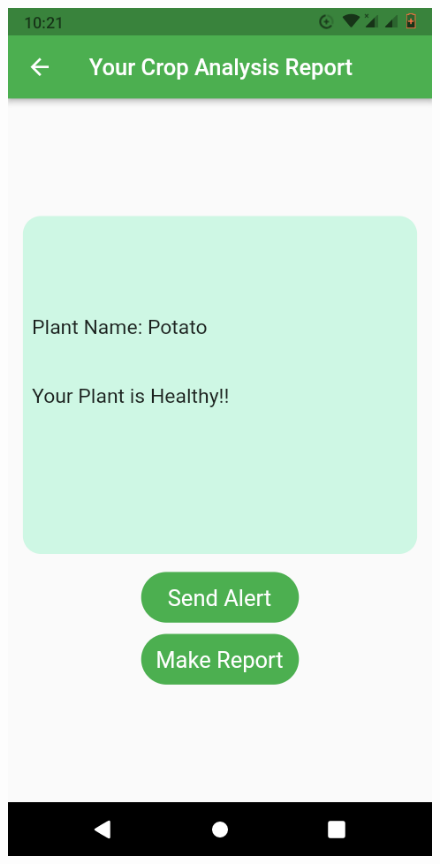 \documentclass[11pt]{report}
\begin{document}
\begin{figure}[h]
	\centerline{\small 
		\includegraphics[height=0.20\textheight]  {h2}}
\end{figure}
\end{document}
